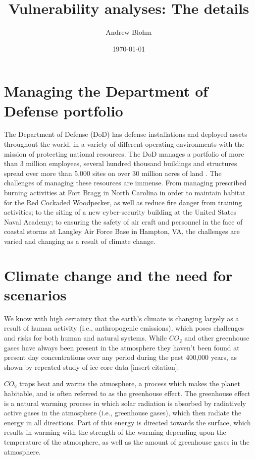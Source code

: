 \documentclass[10pt]{amsart}
\title{Vulnerability analyses: The details}
\author{Andrew Blohm}
\date{\today}
\begin{document}
\maketitle

\section{Managing the Department of Defense portfolio}
The Department of Defense (DoD) has defense installations and deployed assets throughout the world, in a variety of different operating environments with the mission of protecting national resources.
The DoD manages a portfolio of more than 3 million employees, several hundred thousand buildings and structures spread over more than 5,000 sites on over 30 million acres of land \parencite{dodassets2016}.
The challenges of managing these resources are immense.
From managing prescribed burning activities at Fort Bragg in North Carolina in order to maintain habitat for the Red Cockaded Woodpecker, as well as reduce fire danger from training activities; to the siting of a new cyber-security building at the United States Naval Academy; to ensuring the safety of air craft and personnel in the face of coastal storms at Langley Air Force Base in Hampton, VA, the challenges are varied and changing as a result of climate change.

\section{Climate change and the need for scenarios}
We know with high certainty that the earth's climate is changing largely as a result of human activity (i.e., anthropogenic emissions), which poses challenges and risks for both human and natural systems.
While $CO_2$ and other greenhouse gases have always been present in the atmosphere they haven't been found at present day concentrations over any period during the past 400,000 years, as shown by repeated study of ice core data \parencite{}[insert citation].

$CO_2$ traps heat and warms the atmosphere, a process which makes the planet habitable, and is often referred to as the greenhouse effect. 
The greenhouse effect is a natural warming process in which solar radiation is absorbed by radiatively active gases in the atmosphere (i.e., greenhouse gases), which then radiate the energy in all directions.
Part of this energy is directed towards the surface, which results in warming with the strength of the warming depending upon the temperature of the atmosphere, as well as the amount of greenhouse gases in the atmosphere.
\end{document}
